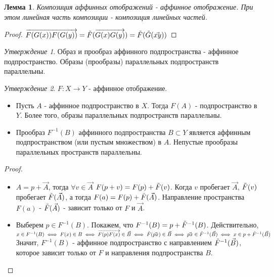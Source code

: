 \documentclass[a4paper,100pt]{article}
\theoremstyle{indented}
\newtheorem{lemma}{Лемма}
\theoremstyle{definition}
\theoremstyle{remark}
\newtheorem{stat}{Утверждение}
\begin{document}
\begin{lemma}
    Композиция аффинных отображений - аффинное отображение. При этом линейная часть композиции - композиция линейных частей.
\end{lemma}

\begin{proof}
    $\overrightarrow{F(G(x))F(G(y))}=\Tilde{F}(\overrightarrow{G(x)G(y)})=\Tilde{F}(\Tilde{G}(\vec{xy}))$
\end{proof} 

\begin{stat}
    Образ и прообраз аффинного подпространства - аффинное подпространство. Образы (прообразы) параллельных подпространств параллельны.
\end{stat}

\begin{stat}
    $F: X \rightarrow Y$ - аффинное отображение.
    \begin{itemize}
        \item Пусть $A$ - аффинное подпространство в $X$. Тогда $F(A)$ - подпространство в $Y$. Более того, образы параллельных подпространств параллельны.
        \item Прообраз $F^{-1}(B)$ аффинного подпространства $B \subset Y$ является аффинным подпространством (или пустым множеством) в $A$. Непустые прообразы параллельных пространств параллельны.
    \end{itemize}
\end{stat}

\begin{proof}
    \begin{itemize}
        \item $A=p+\vec{A}$, тогда $\forall v \in \vec{A}$ $F(p+v)=F(p)+\Tilde{F}(v)$. Когда $v$ пробегает $\vec{A}$, $\Tilde{F}(v)$ пробегает $\Tilde{F}(\vec{A})$, а тогда $F(a)=F(p)+\Tilde{F}(\vec{A})$. Направление пространства $F(a)$ -  $\Tilde{F}(\vec{A})$ - зависит только от $F$ и $\vec{A}$.
        \item Выберем $p \in F^{-1}(B)$. Покажем, что $F^{-1}(B)=p+\Tilde{F}^{-1}(B)$. Действительно, $x \in F^{-1}(B) \iff F(x) \in B \iff \overrightarrow{F(p)F(x)} \in \vec{B} \iff \Tilde{F}(\vec{px}) \in \vec{B} \iff \vec{px} \in \Tilde{F}^{-1}(\vec{B}) \iff x \in p+\Tilde{F}^{-1}(\vec{B})$ Значит, $F^{-1}(B)$ - аффинное подпространство с направлением $\Tilde{F}^{-1}(\vec{B})$, которое зависит только от $F$ и направления подпространства $B$.
    \end{itemize}
\end{proof}
\end{document}
